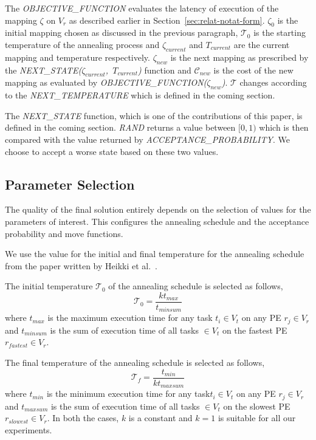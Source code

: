 The \textit{OBJECTIVE\_FUNCTION} evaluates the latency of execution of
the mapping $\zeta$ on $V_r$ as described earlier in
Section~\ref{sec:relat-notat-form}. $\zeta_0$ is the initial mapping
chosen as discussed in the previous paragraph, $\mathcal{T}_0$ is the
starting temperature of the annealing process and $\zeta_{current}$ and
$T_{current}$ are the current mapping and temperature
respectively. $\zeta_{new}$ is the next mapping as prescribed by the
\mbox{\textit{NEXT\_STATE($\zeta_{current}$, $T_{current}$)}} function
and $\mathcal{C}_{new}$ is the cost of the new mapping as evaluated by
\textit{OBJECTIVE\_FUNCTION($\zeta_{new}$)}. $\mathcal{T}$ changes
according to the \textit{NEXT\_TEMPERATURE} which is defined in the
coming section.

The \textit{NEXT\_STATE} function, which is one of the contributions of
this paper, is defined in the coming section. \textit{RAND} returns a
value between $[0, 1)$ which is then compared with the value returned by
\textit{ACCEPTANCE\_PROBABILITY}. We choose to accept a worse state
based on these two values.

\subsection{Parameter Selection}
The quality of the final solution entirely depends on the selection of values
for the parameters of interest. This configures the annealing schedule and the
acceptance probability and move functions.

We use the value for the initial and final temperature for the annealing
schedule from the paper written by Heikki et al.~\cite{hors06}.

The initial temperature $\mathcal{T}_0$ of the annealing schedule is selected as
follows,
\begin{equation}
\mathcal{T}_0 = \frac{kt_{max}}{t_{minsum}}
\end{equation}
where $t_{max}$ is the maximum execution time for any task $t_i \in V_t$ on any
PE $r_j \in V_r$ and $t_{minsum}$ is the sum of execution time of all tasks $\in
V_t$ on the fastest PE $r_{fastest} \in V_r$.

The final temperature of the annealing schedule is selected as follows,
\begin{equation}
\mathcal{T}_f = \frac{t_{min}}{kt_{maxsum}}
\end{equation}
where $t_{min}$ is the minimum execution time for any task$t_i \in V_t$ on any
PE $r_j \in V_r$ and $t_{maxsum}$ is the sum of execution time of all tasks $\in
V_t$ on the slowest PE $r_{slowest} \in V_r$. In both the cases, $k$ is a
constant and $k=1$ is suitable for all our experiments.

